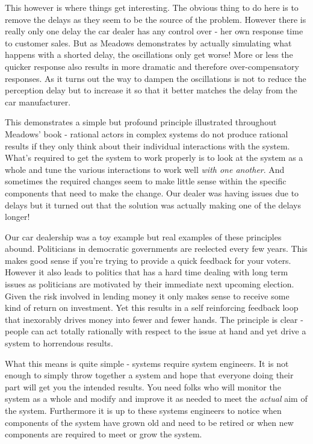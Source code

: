 \documentclass[11pt,a5paper]{book}
\begin{document}
This however is where things get interesting. The obvious thing to do here is to remove the delays as they seem to be the source of the problem. However there is really only one delay the car dealer has any control over - her own response time to customer sales. But as Meadows demonstrates by actually simulating what happens with a shorted delay, the oscillations only get worse! More or less the quicker response also results in more dramatic and therefore over-compensatory responses. As it turns out the way to dampen the oscillations is not to reduce the perception delay but to increase it so that it better matches the delay from the car manufacturer.
\newline

This demonstrates a simple but profound principle illustrated throughout Meadows' book - rational actors in complex systems do not produce rational results if they only think about their individual interactions with the system. What's required to get the system to work properly is to look at the system as a whole and tune the various interactions to work well \textit{with one another}. And sometimes the required changes seem to make little sense within the specific components that need to make the change. Our dealer was having issues due to delays but it turned out that the solution was actually making one of the delays longer!
\newline

Our car dealership was a toy example but real examples of these principles abound. Politicians in democratic governments are reelected every few years. This makes good sense if you're trying to provide a quick feedback for your voters. However it also leads to politics that has a hard time dealing with long term issues as politicians are motivated by their immediate next upcoming election. Given the risk involved in lending money it only makes sense to receive some kind of return on investment. Yet this results in a self reinforcing feedback loop that inexorably drives money into fewer and fewer hands. The principle is clear - people can act totally rationally with respect to the issue at hand and yet drive a system to horrendous results.
\newline

What this means is quite simple - systems require system engineers. It is not enough to simply throw together a system and hope that everyone doing their part will get you the intended results. You need folks who will monitor the system as a whole and modify and improve it as needed to meet the \textit{actual} aim of the system. Furthermore it is up to these systems engineers to notice when components of the system have grown old and need to be retired or when new components are required to meet or grow the system.
\newline
\end{document}
